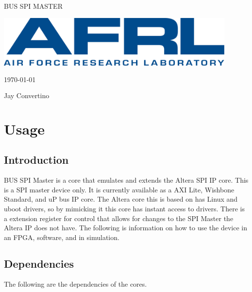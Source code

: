 \begin{titlepage}
  \begin{center}

  {\Huge BUS SPI MASTER}

  \vspace{25mm}

  \includegraphics[width=0.90\textwidth,height=\textheight,keepaspectratio]{img/AFRL.png}

  \vspace{25mm}

  \today

  \vspace{15mm}

  {\Large Jay Convertino}

  \end{center}
\end{titlepage}

\tableofcontents

\newpage

\section{Usage}

\subsection{Introduction}

\par
BUS SPI Master is a core that emulates and extends the Altera SPI IP core. This is a SPI master device only. It is
currently available as a AXI Lite, Wishbone Standard, and uP bus IP core. The Altera core this is based on has Linux
and uboot drivers, so by mimicking it this core has instant access to drivers. There is a extension register for control
that allows for changes to the SPI Master the Altera IP does not have. The following is information on how to use the
device in an FPGA, software, and in simulation.

\subsection{Dependencies}

\par
The following are the dependencies of the cores.

